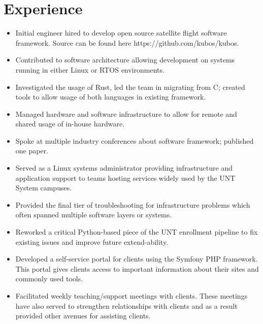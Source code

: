 \documentclass[10pt, letterpaper]{moderncv}
\begin{document}
\maketitle

	\section{Experience}
  {
    \begin{itemize}[rightmargin=30mm]
      \item Initial engineer hired to develop open source satellite flight software framework. Source can be found here https://github.com/kubos/kubos.
      \item Contributed to software architecture allowing development on systems running in either Linux or RTOS environments.
      \item Investigated the usage of Rust, led the team in migrating from C; created tools to allow usage of both languages in existing framework.
      \item Managed hardware and software infrastructure to allow for remote and shared usage of in-house hardware.
      \item Spoke at multiple industry conferences about software framework; published one paper.
    \end{itemize}
  }
	{
		\begin{itemize}[rightmargin=30mm]
			\item Served as a Linux systems administrator providing infrastructure and application support to teams hosting services widely used by the UNT System campuses.
      \item Provided the final tier of troubleshooting for infrastructure problems which often spanned multiple software layers or systems.
      \item Reworked a critical Python-based piece of the UNT enrollment pipeline to fix existing issues and improve future extend-ability.
			\item Developed a self-service portal for clients using the Symfony PHP framework. This portal gives clients access to important information about their sites and commonly used tools.
      \item Facilitated weekly teaching/support meetings with clients. These meetings have also served to strengthen relationships with clients and as a result provided other avenues for assisting clients.
		\end{itemize}
	}
\end{document}
